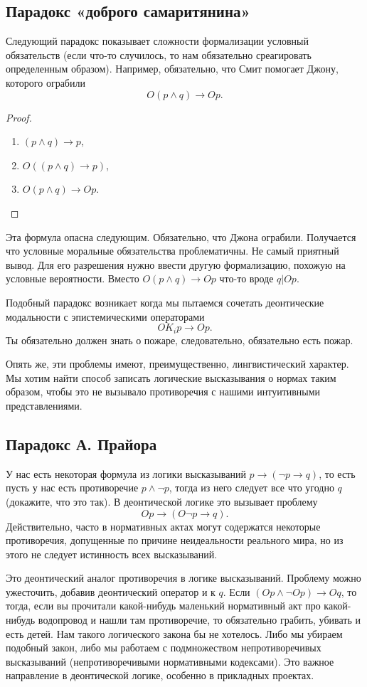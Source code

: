 \documentclass[openany]{book}
\theoremstyle{plain}
\theoremstyle{definition}
\begin{document}
\subsection{Парадокс «доброго самаритянина»}
Следующий парадокс показывает сложности формализации условный обязательств (если что-то случилось, то нам обязательно среагировать определенным образом). Например, обязательно, что Смит помогает Джону, которого ограбили
\[O (p \land q) \to O p.\]

\begin{proof}
    \begin{enumerate}
	\item \((p \land q) \to p\),
	\item \(O((p \land q) \to p)\),
	\item \(O(p \land q) \to O p\).
    \end{enumerate}
\end{proof}

Эта формула опасна следующим. Обязательно, что Джона ограбили. Получается что условные моральные обязательства проблематичны. Не самый приятный вывод. Для его разрешения нужно ввести другую формализацию, похожую на условные вероятности. Вместо \(O (p \land q) \to O p\) что-то вроде \(q | O p\).

Подобный парадокс возникает когда мы пытаемся сочетать деонтические модальности с эпистемическими операторами
\[O K_i p \to O p.\]
Ты обязательно должен знать о пожаре, следовательно, обязательно есть пожар.

Опять же, эти проблемы имеют, преимущественно, лингвистический характер. Мы хотим найти способ записать логические высказывания о нормах таким образом, чтобы это не вызывало противоречия с нашими интуитивными представлениями.

\subsection{Парадокс А. Прайора}
У нас есть некоторая формула из логики высказываний \(p \to (\neg p \to q)\), то есть пусть у нас есть противоречие \(p \land \neg p\), тогда из него следует все что угодно \(q\) (докажите, что это так). В деонтической логике это вызывает проблему \[O p \to (O \neg p \to q).\]Действительно, часто в нормативных актах могут содержатся некоторые противоречия, допущенные по причине неидеальности реального мира, но из этого не следует истинность всех высказываний.

Это деонтический аналог противоречия в логике высказываний. Проблему можно ужесточить, добавив деонтический оператор и к \(q\). Если \((O p \land \neg O p) \to O q\), то тогда, если вы прочитали какой-нибудь маленький нормативный акт про какой-нибудь водопровод и нашли там противоречие, то обязательно грабить, убивать и есть детей. Нам такого логического закона бы не хотелось. Либо мы убираем подобный закон, либо мы работаем с подмножеством непротиворечивых высказываний (непротиворечивыми нормативными кодексами). Это важное направление в деонтической логике, особенно в прикладных проектах.
\end{document}
